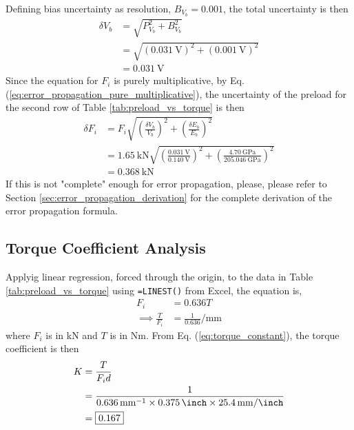 Defining bias uncertainty as resolution, $B_{V_b} = 0.001$, the total uncertainty is then
\begin{align*}
    \delta V_b &= \sqrt{P_{V_b}^2 + B_{V_b}^2} \\
    &= \sqrt{(\qty{0.031}{\volt})^2 + (\qty{0.001}{\volt})^2} \\
    &= \qty{0.031}{\volt}
\end{align*}
Since the equation for $F_i$ is purely multiplicative, by Eq. (\ref{eq:error_propagation_pure_multiplicative}), the uncertainty of the preload for the second row of Table \ref{tab:preload_vs_torque} is then
\begin{align*}
    \delta F_i &= F_i \sqrt{\left(\frac{\delta V_b}{V_b}\right)^2 + \left(\frac{\delta E_b}{E_b}\right)^2} \\
    &= \qty{1.65}{\kilo\newton} \sqrt{\left(\frac{\qty{0.031}{\volt}}{\qty{0.140}{\volt}}\right)^2 + \left(\frac{\qty{4.70}{\giga\pascal}}{\qty{205.046}{\giga\pascal}}\right)^2} \\
    &= \qty{0.368}{\kilo\newton}
\end{align*}
If this is not "complete" enough for error propagation, please, please refer to Section \ref{sec:error_propagation_derivation} for the complete derivation of the error propagation formula.

\subsection{Torque Coefficient Analysis}
Applyig linear regression, forced through the origin, to the data in Table \ref{tab:preload_vs_torque} using \texttt{=LINEST()} from Excel, the equation is,
\begin{align*}
    F_i &= 0.636 T \\
    \implies \frac{T}{F_i} &= \frac{1}{0.636} \unit{\per\milli\meter}
\end{align*}
where $F_i$ is in kN and $T$ is in Nm. From Eq. (\ref{eq:torque_constant}), the torque coefficient is then
\begin{align*}
    K &= \frac{T}{F_i d} \\
    &= \frac{1}{\qty{0.636}{\per\milli\meter} \times \qty{0.375}{\inch} \times \qty{25.4}{\milli\meter\per\inch}} \\
    &= \boxed{\qty{0.167}{}}
\end{align*}


